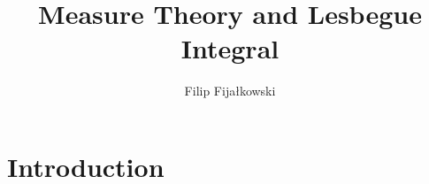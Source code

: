 \documentclass{book}
\title{Measure Theory and Lesbegue Integral}
\author{Filip Fijałkowski}
\date{}
\begin{document}
\maketitle
\tableofcontents

\section{Introduction}
\end{document}
